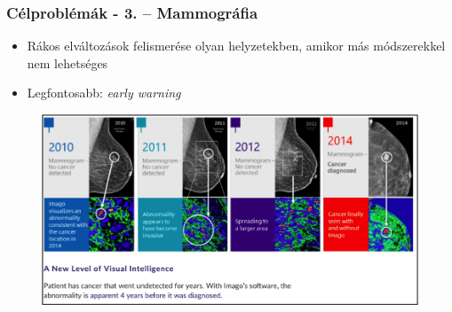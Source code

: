 \begin{frame}
\frametitle{Célproblémák - 3. -- Mammográfia}

\begin{exampleblock}{}
	\begin{itemize}
		\item Rákos elváltozások felismerése olyan helyzetekben, amikor más módszerekkel nem lehetséges
		\item Legfontosabb: \textit{early warning}
	\end{itemize}
\end{exampleblock}

\begin{figure}
	\includegraphics[width=1.0\textwidth]{img/probs3-mammo.png}
\end{figure}

\end{frame}